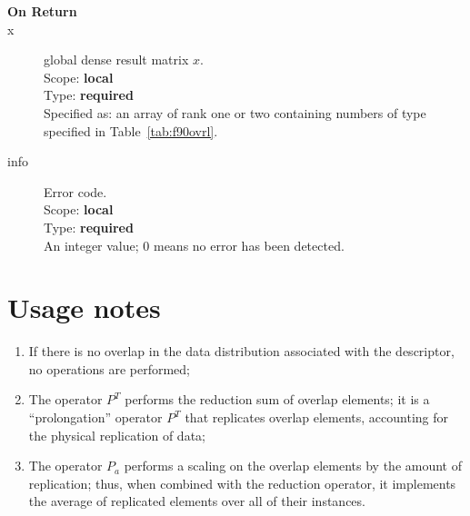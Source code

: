 \begin{description}
\item[\bf On Return] 
\item[x] global dense result matrix $x$.\\
Scope: {\bf local} \\
Type: {\bf required} \\
Specified as: an  array of rank one or two
containing numbers of type specified in
Table~\ref{tab:f90ovrl}.
\item[info] Error code.\\
Scope: {\bf local} \\
Type: {\bf required} \\
An integer value; 0 means no error has been detected. 
\end{description}


\section*{Usage notes}
\begin{enumerate}
\item If there is no overlap in the data distribution associated with
  the descriptor, no operations are performed;
\item The operator $P^{T}$ performs the reduction sum of overlap
elements; it is a ``prolongation'' operator $P^T$ that
replicates overlap elements, accounting for the physical replication
of data;
\item The operator $P_a$ performs a scaling on the overlap elements by
the amount of replication; thus, when combined with the reduction
operator, it implements the average of replicated elements over all of
their instances. 
\end{enumerate}
 
